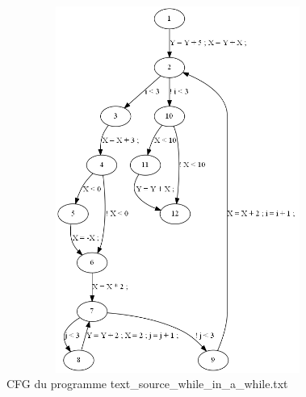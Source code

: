 \documentclass[a4paper]{article}
\begin{document}
\begin{figure}[h!]
  \centering
  \includegraphics[width=12cm,height=12cm,keepaspectratio]{input/text_source_while_in_a_while_cfg.png}
  \caption{CFG du programme text\_source\_while\_in\_a\_while.txt}
  \label{fig:cfg4}
\end{figure}
\end{document}
